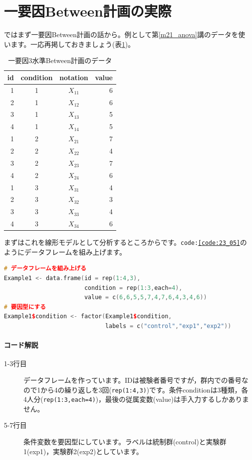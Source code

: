 \documentclass{ltjbook}
\begin{document}
\section{一要因Between計画の実際}
ではまず一要因Between計画の話から。例として第\ref{m21_anova}講のデータを使います。一応再掲しておきましょう(表\ref{table::23_01})。
\begin{table}[ht]
	\centering
	\caption{一要因3水準Between計画のデータ}
	\begin{tabular}{rccr}
		\hline
		id & condition & notation & value \\
		\hline
		1  & 1         & $X_{11}$ & 6     \\
		2  & 1         & $X_{12}$ & 6     \\
		3  & 1         & $X_{13}$ & 5     \\
		4  & 1         & $X_{14}$ & 5     \\
		1  & 2         & $X_{21}$ & 7     \\
		2  & 2         & $X_{22}$ & 4     \\
		3  & 2         & $X_{23}$ & 7     \\
		4  & 2         & $X_{24}$ & 6     \\
		1  & 3         & $X_{31}$ & 4     \\
		2  & 3         & $X_{32}$ & 3     \\
		3  & 3         & $X_{33}$ & 4     \\
		4  & 3         & $X_{34}$ & 6     \\
		\hline
	\end{tabular}
	\label{table::23_01}
\end{table}
まずはこれを線形モデルとして分析するところからです。\texttt{code:\ref{code:23_05}}のようにデータフレームを組み上げます。

\begin{lstlisting}[language=c++,label={code:23_05},caption={データの準備}]
# データフレームを組み上げる
Example1 <- data.frame(id = rep(1:4,3),
                       condition = rep(1:3,each=4),
                       value = c(6,6,5,5,7,4,7,6,4,3,4,6))
# 要因型にする
Example1$condition <- factor(Example1$condition,
                             labels = c("control","exp1","exp2"))\end{lstlisting}

\paragraph{コード解説}
\begin{description}
	\item[1-3行目] データフレームを作っています。IDは被験者番号ですが，群内での番号なので1から4の繰り返しを3回(\texttt{rep(1:4,3)})です。条件conditionは3種類，各4人分(\texttt{rep(1:3,each=4)})，最後の従属変数(value)は手入力するしかありません。
	\item[5-7行目] 条件変数を要因型にしています。ラベルは統制群(control)と実験群1(exp1)，実験群2(exp2)としています。
\end{description}
\end{document}
